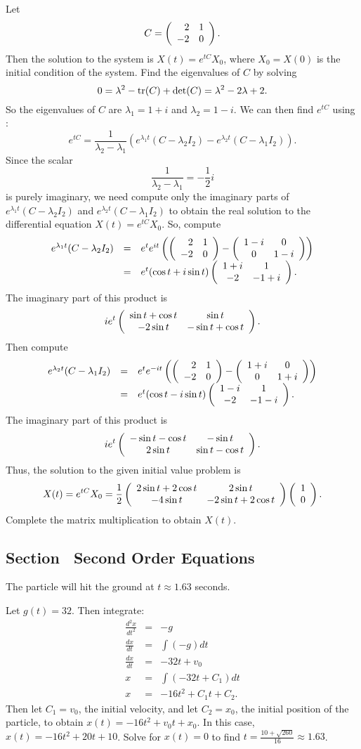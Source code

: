 \soln Let
\[
C = \left(\begin{array}{rr} 2 & 1\\ -2 &0\end{array}\right).
\]
Then the solution to the system is $X(t) = e^{tC}X_0$, where
$X_0 = X(0)$ is the initial condition of the system.
Find the eigenvalues of $C$ by solving
\[
0 = \lambda^2 - {\rm tr}(C) + \det(C) = \lambda^2 - 2\lambda + 2.
\]
So the eigenvalues of $C$ are $\lambda_1 = 1 + i$ and $\lambda_2 = 1 - i$.
We can then find $e^{tC}$ using 
:
\[
e^{tC} = \frac{1}{\lambda_2 - \lambda_1}(e^{\lambda_1 t}(C -
\lambda_2 I_2) - e^{\lambda_2 t}(C - \lambda_1 I_2)).
\]
Since the scalar
\[
\frac{1}{\lambda_2 - \lambda_1} = -\frac{1}{2}i
\]
is purely imaginary, we need compute only the imaginary parts of
$e^{\lambda_1 t}(C - \lambda_2 I_2)$ and $e^{\lambda_2 t}(C - \lambda_1 I_2)$
to obtain the real solution to the differential equation $X(t) = e^{tC}X_0$.
So, compute
\[
\begin{array}{rcl}
e^{\lambda_1 t}(C - \lambda_2 I_2)
& = & e^{t}e^{it}\left(\left(\begin{array}{rr} 2 & 1\\ -2 &0\end{array}\right) - \left(\begin{array}{cc} 1 - i & 0\\ 0 &1 - i\end{array}\right)
\right) \\
& = & e^{t}(\cos t + i\sin t)\left(\begin{array}{cc} 1 + i & 1\\ -2 &-1 + i\end{array}\right).
\end{array}
\]
The imaginary part of this product is
\[
ie^t\left(\begin{array}{cc} \sin t + \cos t & \sin t\\ -2\sin t &-\sin t + \cos t\end{array}\right).
\]
Then compute
\[
\begin{array}{rcl}
e^{\lambda_2 t}(C - \lambda_1 I_2)
& = & e^{t}e^{-it}\left(\left(\begin{array}{rr} 2 & 1\\ -2 &0\end{array}\right) - \left(\begin{array}{cc} 1 + i & 0\\ 0 &1 + i\end{array}\right)
\right) \\
& = & e^{t}(\cos t - i\sin t)\left(\begin{array}{cc} 1 - i & 1\\ -2 &-1 - i\end{array}\right).
\end{array}
\]
The imaginary part of this product is
\[
ie^t\left(\begin{array}{cc} -\sin t - \cos t & -\sin t\\ 2\sin t &\sin t - \cos t\end{array}\right).
\]
Thus, the solution to the given initial value problem is
\[
X(t) = e^{tC}X_0 =
\frac{1}{2}\left(\begin{array}{cc} 2\sin t + 2\cos t & 2\sin t\\ -4\sin t &-2\sin t + 2\cos t\end{array}\right)
\left(\begin{array}{r} 1 \\ 0\end{array}\right).
\]
Complete the matrix multiplication to obtain $X(t)$.



\subsection*{Section~\protect{\ref{S:SOE}} Second Order Equations}

\ans The particle will hit the ground at $t \approx 1.63$ seconds.

\soln Let $g(t) = 32$.  Then integrate:
\[
\begin{array}{rcl}
\frac{d^2x}{dt^2} & = & -g \\
\frac{dx}{dt} & = & \int (-g)dt \\
\frac{dx}{dt} & = & -32t + v_0 \\
x & = & \int (-32t + C_1)dt \\
x & = & -16t^2 + C_1t + C_2.
\end{array}
\]
Then let $C_1 = v_0$, the initial velocity, and let $C_2 = x_0$, the initial
position of the particle, to obtain $x(t) = -16t^2 + v_0t + x_0$.  In this
case, $x(t) = -16t^2 + 20t + 10$.  Solve for $x(t) = 0$ to find
$t = \frac{10 + \sqrt{260}}{16} \approx 1.63$.

